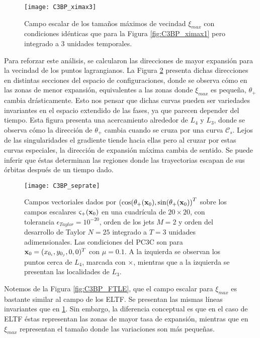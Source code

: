 \begin{figure}
 \centering
 \texttt{[image: C3BP\_ximax3]}
 \caption{Campo escalar de los tamaños máximos de vecindad $\xi_{max}$ con condiciones idénticas que para la Figura \ref{fig:C3BP_ximax1} pero integrado a $3$ unidades temporales.}

 \label{fig:C3BP_ximax3}
\end{figure}

Para reforzar este análisis, se calcularon las direcciones de mayor expansión para la vecindad de los puntos lagrangianos. La Figura \ref{fig:C3BP_seprate3} presenta dichas direcciones en distintas secciones del espacio de configuraciones, donde se observa cómo en las zonas de menor expansión, equivalentes a las zonas donde $\xi_{max}$ es pequeña,  $\theta_{+}$ cambia drásticamente. Esto nos pensar que dichas curvas pueden ser variedades invariantes en el espacio extendido de las fases, ya que parecen depender del tiempo. Esta figura presenta una acercamiento alrededor de $L_4$ y $L_3$, donde se observa cómo la dirección de  $\theta_{+}$ cambia cuando se cruza por una curva $\mathcal{C}_s$. Lejos de las singularidades el gradiente tiende hacia ellas pero al cruzar por estas curvas especiales, la dirección de expansión máxima cambia de sentido. Se puede inferir que éstas determinan las regiones donde las trayectorias escapan de sus órbitas después de un tiempo dado.


\begin{figure}
 \centering
 \texttt{[image: C3BP\_seprate]}
 \caption{Campos vectoriales dados por $\left( \cos(\theta_{+}(\mathbf{x}_0), \sin(\theta_{+}(\mathbf{x}_0) \right)^T$ sobre los campos escalares $\varsigma_{+}(\mathbf{x}_0)$ en una cuadrícula de $20 \times 20$, con tolerancia $\epsilon_{Taylor} = 10^{-20}$, orden de los jets $M=2$ y orden del desarrollo de Taylor $N = 25$ integrado a $T = 3$ unidades adimensionales. Las condiciones del PC3C son para $\mathbf{x}_0 = (x_{0_i}, y_{0_j}, 0, 0)^T$ con $\mu = 0.1$. A la izquierda se observan los puntos cerca de $L_4$, marcada con $\times$, mientras que a la izquierda se presentan las localidades de $L_3$.}
 \label{fig:C3BP_seprate3}
\end{figure}

Notemos de la Figura \ref{fig:C3BP_FTLE}, que el campo escalar para $\xi_{max}$ es bastante similar al campo de los ELTF. Se presentan las mismas líneas invariantes que en \ref{fig:C3BP_ximax3}. Sin embargo, la diferencia conceptual es que en el caso de ELTF éstas representan las zonas de mayor tasa de expansión, mientras que en $\xi_{max}$ representan el tamaño donde las variaciones son más pequeñas.

